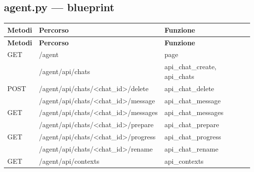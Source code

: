\subsection{agent.py --- blueprint }
\begin{longtable}{@{}L{17mm}L{74mm}L{45mm}@{}}
\toprule
\textbf{Metodi} & \textbf{Percorso} & \textbf{Funzione} \\
\midrule\endfirsthead
\toprule
\textbf{Metodi} & \textbf{Percorso} & \textbf{Funzione} \\
\midrule\endhead
{\scriptsize\sffamily GET} & {\ttfamily\scriptsize /\allowbreak agent} & {\ttfamily\scriptsize page} \\
 & {\ttfamily\scriptsize /\allowbreak agent/\allowbreak api/\allowbreak chats} & {\ttfamily\scriptsize api\_\allowbreak{}chat\_\allowbreak{}create, api\_\allowbreak{}chats} \\
{\scriptsize\sffamily POST} & {\ttfamily\scriptsize /\allowbreak agent/\allowbreak api/\allowbreak chats/\allowbreak <chat\_\allowbreak{}id>/\allowbreak delete} & {\ttfamily\scriptsize api\_\allowbreak{}chat\_\allowbreak{}delete} \\
 & {\ttfamily\scriptsize /\allowbreak agent/\allowbreak api/\allowbreak chats/\allowbreak <chat\_\allowbreak{}id>/\allowbreak message} & {\ttfamily\scriptsize api\_\allowbreak{}chat\_\allowbreak{}message} \\
{\scriptsize\sffamily GET} & {\ttfamily\scriptsize /\allowbreak agent/\allowbreak api/\allowbreak chats/\allowbreak <chat\_\allowbreak{}id>/\allowbreak messages} & {\ttfamily\scriptsize api\_\allowbreak{}chat\_\allowbreak{}messages} \\
 & {\ttfamily\scriptsize /\allowbreak agent/\allowbreak api/\allowbreak chats/\allowbreak <chat\_\allowbreak{}id>/\allowbreak prepare} & {\ttfamily\scriptsize api\_\allowbreak{}chat\_\allowbreak{}prepare} \\
{\scriptsize\sffamily GET} & {\ttfamily\scriptsize /\allowbreak agent/\allowbreak api/\allowbreak chats/\allowbreak <chat\_\allowbreak{}id>/\allowbreak progress} & {\ttfamily\scriptsize api\_\allowbreak{}chat\_\allowbreak{}progress} \\
 & {\ttfamily\scriptsize /\allowbreak agent/\allowbreak api/\allowbreak chats/\allowbreak <chat\_\allowbreak{}id>/\allowbreak rename} & {\ttfamily\scriptsize api\_\allowbreak{}chat\_\allowbreak{}rename} \\
{\scriptsize\sffamily GET} & {\ttfamily\scriptsize /\allowbreak agent/\allowbreak api/\allowbreak contexts} & {\ttfamily\scriptsize api\_\allowbreak{}contexts} \\
\bottomrule
\end{longtable}

